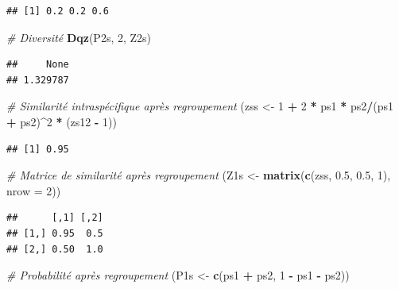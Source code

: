 \documentclass[
  11pt,
  french,
  a4paper,
  extrafontsizes,onecolumn,openright
  ]{memoir}
\newenvironment{Shaded}{\begin{snugshade}}{\end{snugshade}}
\newcommand{\AttributeTok}[1]{\textcolor[rgb]{0.13,0.29,0.53}{#1}}
\newcommand{\CommentTok}[1]{\textcolor[rgb]{0.56,0.35,0.01}{\textit{#1}}}
\newcommand{\DecValTok}[1]{\textcolor[rgb]{0.00,0.00,0.81}{#1}}
\newcommand{\FloatTok}[1]{\textcolor[rgb]{0.00,0.00,0.81}{#1}}
\newcommand{\FunctionTok}[1]{\textcolor[rgb]{0.13,0.29,0.53}{\textbf{#1}}}
\newcommand{\NormalTok}[1]{#1}
\newcommand{\OtherTok}[1]{\textcolor[rgb]{0.56,0.35,0.01}{#1}}
\newcommand{\SpecialCharTok}[1]{\textcolor[rgb]{0.81,0.36,0.00}{\textbf{#1}}}
\begin{document}
\begin{verbatim}
## [1] 0.2 0.2 0.6
\end{verbatim}

\begin{Shaded}
\begin{Highlighting}[]
\CommentTok{\# Diversité}
\FunctionTok{Dqz}\NormalTok{(P2s, }\DecValTok{2}\NormalTok{, Z2s)}
\end{Highlighting}
\end{Shaded}

\begin{verbatim}
##     None 
## 1.329787
\end{verbatim}

\begin{Shaded}
\begin{Highlighting}[]
\CommentTok{\# Similarité intraspécifique après regroupement}
\NormalTok{(zss }\OtherTok{\textless{}{-}} \DecValTok{1} \SpecialCharTok{+} \DecValTok{2} \SpecialCharTok{*}\NormalTok{ ps1 }\SpecialCharTok{*}\NormalTok{ ps2}\SpecialCharTok{/}\NormalTok{(ps1 }\SpecialCharTok{+}\NormalTok{ ps2)}\SpecialCharTok{\^{}}\DecValTok{2} \SpecialCharTok{*}\NormalTok{ (zs12 }\SpecialCharTok{{-}} \DecValTok{1}\NormalTok{))}
\end{Highlighting}
\end{Shaded}

\begin{verbatim}
## [1] 0.95
\end{verbatim}

\begin{Shaded}
\begin{Highlighting}[]
\CommentTok{\# Matrice de similarité après regroupement}
\NormalTok{(Z1s }\OtherTok{\textless{}{-}} \FunctionTok{matrix}\NormalTok{(}\FunctionTok{c}\NormalTok{(zss, }\FloatTok{0.5}\NormalTok{, }\FloatTok{0.5}\NormalTok{, }\DecValTok{1}\NormalTok{), }\AttributeTok{nrow =} \DecValTok{2}\NormalTok{))}
\end{Highlighting}
\end{Shaded}

\begin{verbatim}
##      [,1] [,2]
## [1,] 0.95  0.5
## [2,] 0.50  1.0
\end{verbatim}

\begin{Shaded}
\begin{Highlighting}[]
\CommentTok{\# Probabilité après regroupement}
\NormalTok{(P1s }\OtherTok{\textless{}{-}} \FunctionTok{c}\NormalTok{(ps1 }\SpecialCharTok{+}\NormalTok{ ps2, }\DecValTok{1} \SpecialCharTok{{-}}\NormalTok{ ps1 }\SpecialCharTok{{-}}\NormalTok{ ps2))}
\end{Highlighting}
\end{Shaded}
\end{document}
